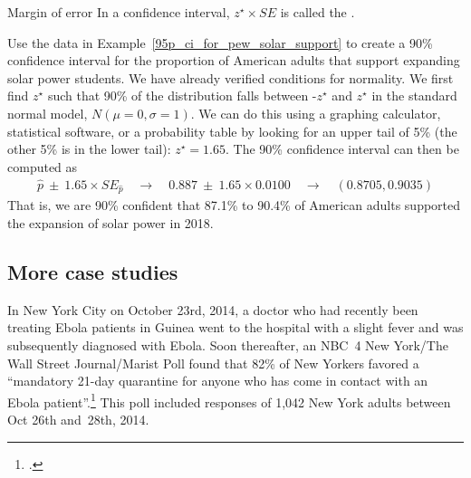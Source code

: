 \begin{onebox}{Margin of error}
  \label{marginOfErrorTermBox}%
  In a confidence interval, $z^{\star}\times SE$ is called the
  .
\end{onebox}

\begin{examplewrap}
\begin{nexample}{Use the data in
    Example~\ref{95p_ci_for_pew_solar_support} to
    create a 90\% confidence interval for the proportion of American
    adults that support expanding solar power students.
    We have already verified conditions for normality.}
  We first find $z^{\star}$ such that 90\% of the distribution falls
  between -$z^{\star}$ and $z^{\star}$ in the standard normal model,
  $N(\mu=0, \sigma=1)$. We can do this using a graphing calculator,
  statistical software, or a probability table by looking for an upper
  tail of 5\% (the other 5\% is in the lower tail): $z^{\star}=1.65$.
  The 90\% confidence interval can then be computed as
  \begin{align*}
  \hat{p}\ \pm\ 1.65\times SE_{\hat{p}}
      \quad\to\quad 0.887\ \pm\ 1.65\times 0.0100
      \quad\to\quad (0.8705, 0.9035)
  \end{align*}
  That is, we are 90\% confident that 87.1\% to 90.4\% of American
  adults supported the expansion of solar power in 2018.
\end{nexample}
\end{examplewrap}



\subsection{More case studies}


\newcommand{\wsjebolapollsize}{1042}
\newcommand{\wsjebolapollsizecomma}{1,042}
\newcommand{\wsjebolapollprop}{0.82}
\newcommand{\wsjebolapollpropcomplement}{0.18}
\newcommand{\wsjebolapollpercent}{82}
\newcommand{\wsjebolapollpercentcomplement}{18}
\newcommand{\wsjebolapollcount}{854}
\newcommand{\wsjebolapollcountcomplement}{188}
\newcommand{\wsjebolapollse}{0.012}


In New York City on October 23rd, 2014, a doctor who had recently been
treating Ebola patients in Guinea went to the hospital with a slight fever
and was subsequently diagnosed with Ebola. Soon thereafter,
an NBC~4 New York/The Wall Street Journal/Marist Poll found that
\wsjebolapollpercent{}\% of New Yorkers favored a ``mandatory 21-day
quarantine for anyone who has come in contact with an Ebola
patient''.\footnote{.} This poll included responses
of \wsjebolapollsizecomma{} New York adults between
Oct 26th and~28th, 2014.

